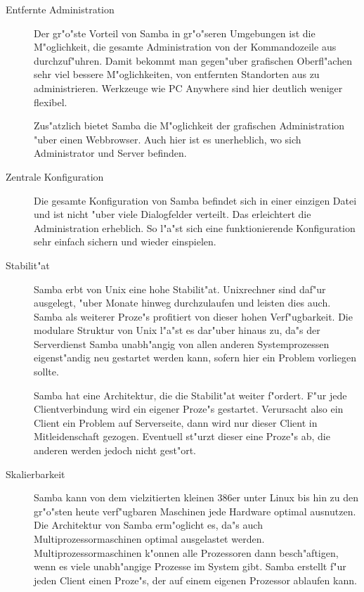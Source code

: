 \documentclass{scrartcl}
\begin{document}
\begin{description}
  
\item[Entfernte Administration] Der gr"o"ste Vorteil von Samba in
  gr"o"seren Umgebungen ist die M"oglichkeit, die gesamte
  Administration von der Kommandozeile aus durchzuf"uhren. Damit
  bekommt man gegen"uber grafischen Oberfl"achen sehr viel bessere
  M"oglichkeiten, von entfernten Standorten aus zu administrieren.
  Werkzeuge wie PC Anywhere sind hier deutlich weniger flexibel.
  
  Zus"atzlich bietet Samba die M"oglichkeit der grafischen
  Administration "uber einen Webbrowser. Auch hier ist es unerheblich,
  wo sich Administrator und Server befinden.
  
\item[Zentrale Konfiguration] Die gesamte Konfiguration von Samba
  befindet sich in einer einzigen Datei und ist nicht "uber viele
  Dialogfelder verteilt. Das erleichtert die Administration erheblich.
  So l"a"st sich eine funktionierende Konfiguration sehr einfach
  sichern und wieder einspielen.
  
\item[Stabilit"at] Samba erbt von Unix eine hohe Stabilit"at.
  Unixrechner sind daf"ur ausgelegt, "uber Monate hinweg durchzulaufen
  und leisten dies auch. Samba als weiterer Proze"s profitiert von
  dieser hohen Verf"ugbarkeit. Die modulare Struktur von Unix l"a"st
  es dar"uber hinaus zu, da"s der Serverdienst Samba unabh"angig von
  allen anderen Systemprozessen eigenst"andig neu gestartet werden
  kann, sofern hier ein Problem vorliegen sollte.
  
  Samba hat eine Architektur, die die Stabilit"at weiter f"ordert.
  F"ur jede Clientverbindung wird ein eigener Proze"s gestartet.
  Verursacht also ein Client ein Problem auf Serverseite, dann wird
  nur dieser Client in Mitleidenschaft gezogen.  Eventuell
  st"urzt dieser eine Proze"s ab, die anderen werden jedoch 
  nicht gest"ort.
  
\item[Skalierbarkeit] Samba kann von dem vielzitierten kleinen 386er
  unter Linux bis hin zu den gr"o"sten heute verf"ugbaren Maschinen
  jede Hardware optimal ausnutzen. Die Architektur von Samba
  erm"oglicht es, da"s auch Multiprozessormaschinen optimal
  ausgelastet werden. Multiprozessormaschinen k"onnen alle Prozessoren dann
  besch"aftigen, wenn es viele unabh"angige Prozesse im System gibt.
  Samba erstellt f"ur jeden Client einen Proze"s, der auf einem
  eigenen Prozessor ablaufen kann.
  

\end{description}
\end{document}
